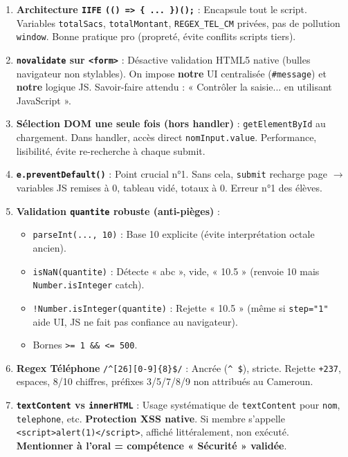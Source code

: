 \documentclass[11pt]{article}
\newcommand{\cle}[1]{{\popxbold\color{popdark}#1}}
\begin{document}
\begin{propriete}
\begin{enumerate}
    \item \textbf{Architecture \texttt{IIFE} \texttt{(() => \{ ... \})();}} : Encapsule tout le script. Variables \texttt{totalSacs}, \texttt{totalMontant}, \texttt{REGEX\_TEL\_CM} privées, pas de pollution \texttt{window}. Bonne pratique pro (propreté, évite conflits scripts tiers).
    \item \textbf{\texttt{novalidate} sur \texttt{<form>}} : Désactive validation HTML5 native (bulles navigateur non stylables). On impose \textbf{notre} UI centralisée (\texttt{\#message}) et \textbf{notre} logique JS. Savoir-faire attendu : « Contrôler la saisie... en utilisant JavaScript ».
    \item \textbf{Sélection DOM \textbf{une seule fois} (hors handler)} : \texttt{getElementById} au chargement. Dans handler, accès direct \texttt{nomInput.value}. Performance, lisibilité, évite re-recherche à chaque submit.
    \item \textbf{\texttt{e.preventDefault()}} : \cle{Point crucial n°1}. Sans cela, \texttt{submit} recharge page $\rightarrow$ variables JS remises à 0, tableau vidé, totaux à 0. Erreur n°1 des élèves.
    \item \textbf{Validation \texttt{quantite} robuste (anti-pièges)} :
    \begin{itemize}
        \item \texttt{parseInt(..., 10)} : Base 10 explicite (évite interprétation octale ancien).
        \item \texttt{isNaN(quantite)} : Détecte « abc », vide, « 10.5 » (renvoie 10 mais \texttt{Number.isInteger} catch).
        \item \texttt{!Number.isInteger(quantite)} : Rejette « 10.5 » (même si \texttt{step="1"} aide UI, JS ne fait pas confiance au navigateur).
        \item Bornes \verb|>= 1 && <= 500|.
    \end{itemize}
    \item \textbf{Regex Téléphone} \verb|/^[26][0-9]{8}$/| : Ancrée (\verb|^ $|), stricte. Rejette \texttt{+237}, espaces, 8/10 chiffres, préfixes 3/5/7/8/9 non attribués au Cameroun.
    \item \textbf{\texttt{textContent} vs \texttt{innerHTML}} : Usage systématique de \texttt{textContent} pour \texttt{nom}, \texttt{telephone}, etc. \textbf{Protection XSS native}. Si membre s'appelle \texttt{<script>alert(1)</script>}, affiché littéralement, non exécuté. \textbf{Mentionner à l'oral = compétence « Sécurité » validée}.

\end{enumerate}
\end{propriete}
\end{document}
